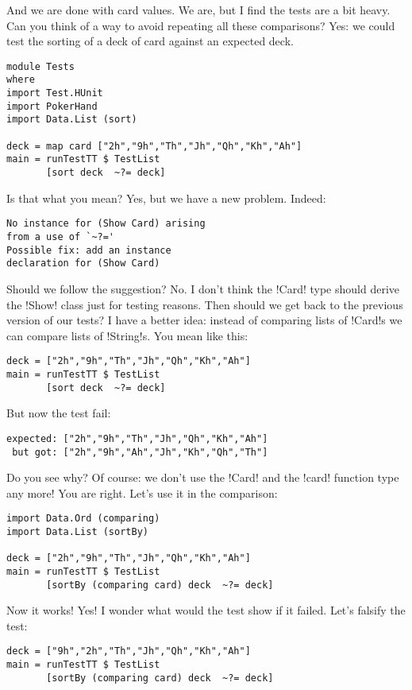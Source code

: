 \success And we are done with card values.
\lhN We are, but I find the tests are a bit heavy. Can you think of a way to avoid repeating all these comparisons?
\lhA Yes: we could test the sorting of a deck of card against an expected deck.
\lhN 
\begin{lstlisting}[frame=single]
module Tests
where 
import Test.HUnit
import PokerHand
import Data.List (sort)

deck = map card ["2h","9h","Th","Jh","Qh","Kh","Ah"]
main = runTestTT $ TestList 
       [sort deck  ~?= deck]
\end{lstlisting} %
Is that what you mean?
\lhA \error Yes, but we have a new problem.
\lhN \error Indeed:
\begin{verbatim}
No instance for (Show Card) arising
from a use of `~?='
Possible fix: add an instance 
declaration for (Show Card)
\end{verbatim}
Should we follow the suggestion?
\lhA \error No. I don't think the \il!Card! type should derive the \il!Show! class just for testing reasons.
\lhN Then should we get back to the previous version of our tests?
\lhA I have a better idea: instead of comparing lists of \il!Card!s we can compare lists of \il!String!s.
\lhN \error You mean like this: 
\begin{lstlisting}[frame=single]
deck = ["2h","9h","Th","Jh","Qh","Kh","Ah"]
main = runTestTT $ TestList 
       [sort deck  ~?= deck]
\end{lstlisting} %
\failure But now the test fail:
\begin{verbatim}
expected: ["2h","9h","Th","Jh","Qh","Kh","Ah"]
 but got: ["2h","9h","Ah","Jh","Kh","Qh","Th"]
\end{verbatim}
Do you see why?
\lhA \failure Of course: we don't use the \il!Card! and the \il!card! function type any more!
\lhN You are right. Let's use it in the comparison:
\begin{lstlisting}[frame=single]
import Data.Ord (comparing)
import Data.List (sortBy)

deck = ["2h","9h","Th","Jh","Qh","Kh","Ah"]
main = runTestTT $ TestList 
       [sortBy (comparing card) deck  ~?= deck]
\end{lstlisting} %
\success Now it works!
\lhA Yes!
\lhN I wonder what would the test show if it failed. Let's falsify the test:
\begin{lstlisting}[frame=single]
deck = ["9h","2h","Th","Jh","Qh","Kh","Ah"]
main = runTestTT $ TestList 
       [sortBy (comparing card) deck  ~?= deck]
\end{lstlisting} %
